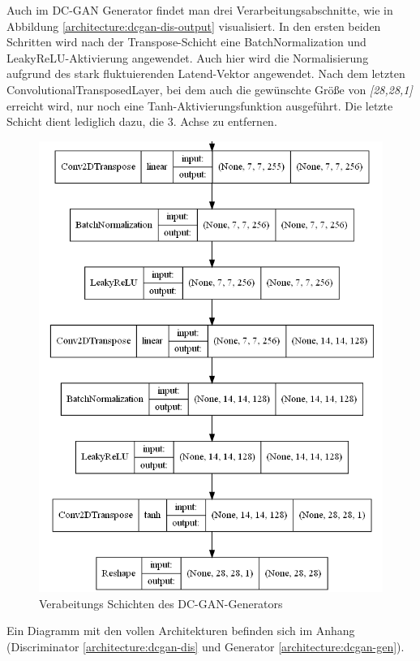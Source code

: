 Auch im DC-GAN Generator findet man drei Verarbeitungsabschnitte, wie in Abbildung \ref{architecture:dcgan-dis-output} visualisiert.
In den ersten beiden Schritten wird nach der Transpose-Schicht eine BatchNormalization und LeakyReLU-Aktivierung angewendet.
Auch hier wird die Normalisierung aufgrund des stark fluktuierenden Latend-Vektor angewendet.
Nach dem letzten ConvolutionalTransposedLayer, bei dem auch die gewünschte Größe von \textit{[28,28,1]} erreicht wird, nur noch eine Tanh-Aktivierungsfunktion ausgeführt.
Die letzte Schicht dient lediglich dazu, die 3. Achse zu entfernen.

\begin{figure}[H]
	\centering
	\includegraphics[width=0.6\textheight]{kapitel/5_ergebnisse/architectures/dcgan_generator/output.png}
	\caption{Verabeitungs Schichten des DC-GAN-Generators}
	\label{architecture:dcgan-gen-output}
\end{figure}

Ein Diagramm mit den vollen Architekturen befinden sich im Anhang (Discriminator \cref{architecture:dcgan-dis} und Generator \cref{architecture:dcgan-gen}).
